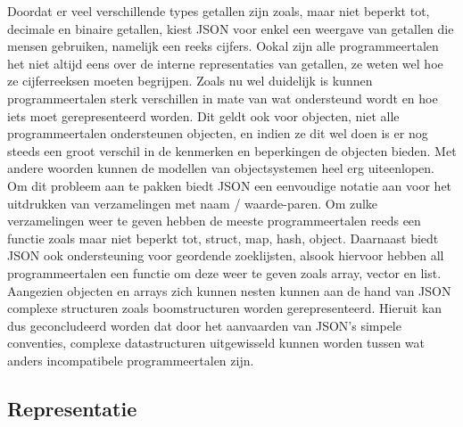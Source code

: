 Doordat er veel verschillende types getallen zijn zoals, maar niet beperkt tot, decimale en binaire getallen, kiest JSON voor enkel een weergave van getallen die mensen gebruiken, namelijk een reeks cijfers. Ookal zijn alle programmeertalen het niet altijd eens over de interne representaties van getallen, ze weten wel hoe ze cijferreeksen moeten begrijpen.
Zoals nu wel duidelijk is kunnen programmeertalen sterk verschillen in mate van wat ondersteund wordt en hoe iets moet gerepresenteerd worden. Dit geldt ook voor objecten, niet alle programmeertalen ondersteunen objecten, en indien ze dit wel doen is er nog steeds een groot verschil in de kenmerken en beperkingen de objecten bieden. Met andere woorden kunnen de modellen van objectsystemen heel erg uiteenlopen. Om dit probleem aan te pakken biedt JSON een eenvoudige notatie aan voor het uitdrukken van verzamelingen met naam / waarde-paren. Om zulke verzamelingen weer te geven hebben de meeste programmeertalen reeds een functie zoals maar niet beperkt tot, struct, map, hash, object.
Daarnaast biedt JSON ook ondersteuning voor geordende zoeklijsten, alsook hiervoor hebben all programmeertalen een functie om deze weer te geven zoals array, vector en list. Aangezien objecten en arrays zich kunnen nesten kunnen aan de hand van JSON complexe structuren zoals boomstructuren worden gerepresenteerd.
Hieruit kan dus geconcludeerd worden dat door het aanvaarden van JSON's simpele conventies, complexe datastructuren uitgewisseld kunnen worden tussen wat anders incompatibele programmeertalen zijn.



\subsection{Representatie}
\label{subsec:Representatie}




